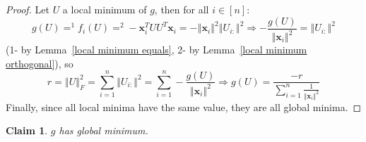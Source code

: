 \documentclass{article}
\newtheorem{claim}{Claim}
\newcommand{\Lemmaref}[1]{Lemma~\ref{#1}}
\newcommand{\x}{{\mathbf x}}
\begin{document}
\begin{proof}

Let $U$ a local minimum of $g$, then for all $i\in[n]$:
$$
g(U)=^1f_i(U)=^2-\x_i^TUU^T\x_i=-\left\Vert\x_{i}\right\Vert^{2}\left\Vert U_{i:}\right\Vert^2\Rightarrow - \frac{g(U)}{\left\Vert\x_{i}\right\Vert^{2}} = \left\Vert U_{i:}\right\Vert^2
$$
(1- by \Lemmaref{local minimum equals}, 2- by \Lemmaref{local minimum orthogonal}), so
$$
r=\left\Vert U\right\Vert^2_F=\sum_{i=1}^n \left\Vert U_{i:}\right\Vert^2=\sum_{i=1}^n - \frac{g(U)}{\left\Vert\x_{i}\right\Vert^{2}}\Rightarrow g(U)= \frac{-r}{\sum_{i=1}^n \frac{1}{\left\Vert\x_{i}\right\Vert^{2}}}
$$
Finally, since all local minima have the same value, they are all global minima.



\end{proof}

\begin{claim} \label{has minimum}
$g$ has global minimum.
\end{claim}
\end{document}

